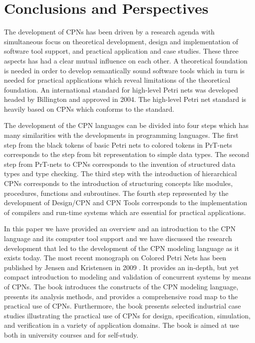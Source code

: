 \section{Conclusions and Perspectives}

The development of CPNs has been driven by a research agenda with
simultaneous focus on theoretical development, design and
implementation of software tool support, and practical application and
case studies. These three aspects has had a clear mutual influence on
each other. A theoretical foundation is needed in order to develop
semantically sound software tools which in turn is needed for
practical applications which reveal limitations of the theoretical
foundation. An international standard for high-level Petri nets was
developed headed by Billington \cite{hcpnstandard} and approved in
2004. The high-level Petri net standard is heavily based on CPNs which
conforms to the standard.


The development of the CPN languages can be divided into four
steps which has many similarities with the developments in programming
languages. The first step from the black tokens of basic Petri nets to
colored tokens in PrT-nets corresponds to the step from bit
representation to simple data types. The second step from PrT-nets to
CPNs corresponds to the invention of structured data types and type
checking. The third step with the introduction of hierarchical CPNs
corresponds to the introduction of structuring concepts like modules,
procedures, functions and subroutines. The fourth step represented by
the development of Design/CPN and CPN Tools corresponds to the
implementation of compilers and run-time systems which are essential
for practical applications.

In this paper we have provided an overview and an introduction to the
CPN language and its computer tool support and we have discussed the
research development that led to the development of the CPN modeling
language as it exists today. The most recent monograph on Colored
Petri Nets has been published by Jensen and Kristensen in 2009
\cite{newcpnbook}. It provides an in-depth, but yet compact
introduction to modeling and validation of concurrent systems by means
of CPNs. The book introduces the constructs of the CPN modeling
language, presents its analysis methods, and provides a comprehensive
road map to the practical use of CPNs. Furthermore, the book presents
selected industrial case studies illustrating the practical use of
CPNs for design, specification, simulation, and verification in a
variety of application domains. The book is aimed at use both in
university courses and for self-study.

